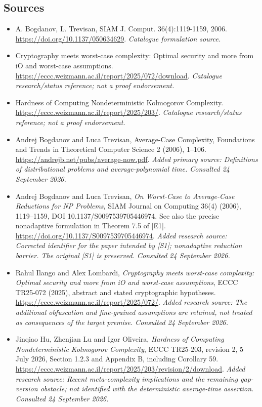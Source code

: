 \documentclass[11pt]{article}
\begin{document}
\subsection{Sources}
\begin{itemize}\raggedright
\item[\textnormal{[S1]}]\hypertarget{source:statement:1}{} A. Bogdanov, L. Trevisan, SIAM J. Comput. 36(4):1119-1159, 2006.
\url{https://doi.org/10.1137/050634629}.
{\small\textit{Catalogue formulation source.}}
\item[\textnormal{[S2]}]\hypertarget{source:statement:2}{} Cryptography meets worst-case complexity: Optimal security and more from iO and worst-case assumptions.
\url{https://eccc.weizmann.ac.il/report/2025/072/download}.
{\small\textit{Catalogue research/status reference; not a proof endorsement.}}
\item[\textnormal{[S3]}]\hypertarget{source:statement:3}{} Hardness of Computing Nondeterministic Kolmogorov Complexity.
\url{https://eccc.weizmann.ac.il/report/2025/203/}.
{\small\textit{Catalogue research/status reference; not a proof endorsement.}}
\item[\textnormal{[E1]}]\hypertarget{extra:statement:1}{} Andrej Bogdanov and Luca Trevisan, Average-Case Complexity, Foundations and Trends in Theoretical Computer Science 2 (2006), 1--106.
\url{https://andrejb.net/pubs/average-now.pdf}.
{\small\textit{Added primary source: Definitions of distributional problems and average-polynomial time. Consulted 24 September 2026.}}
\item[\textnormal{[E2]}]\hypertarget{extra:statement:2}{} Andrej Bogdanov and Luca Trevisan, \emph{On Worst-Case to Average-Case Reductions for NP Problems}, SIAM Journal on Computing 36(4) (2006), 1119--1159, DOI 10.1137/S0097539705446974. See also the precise nonadaptive formulation in Theorem 7.5 of [E1].
\url{https://doi.org/10.1137/S0097539705446974}.
{\small\textit{Added research source: Corrected identifier for the paper intended by [S1]; nonadaptive reduction barrier. The original [S1] is preserved. Consulted 24 September 2026.}}
\item[\textnormal{[E3]}]\hypertarget{extra:statement:3}{} Rahul Ilango and Alex Lombardi, \emph{Cryptography meets worst-case complexity: Optimal security and more from iO and worst-case assumptions}, ECCC TR25-072 (2025), abstract and stated cryptographic hypotheses.
\url{https://eccc.weizmann.ac.il/report/2025/072/}.
{\small\textit{Added research source: The additional obfuscation and fine-grained assumptions are retained, not treated as consequences of the target premise. Consulted 24 September 2026.}}
\item[\textnormal{[E4]}]\hypertarget{extra:statement:4}{} Jinqiao Hu, Zhenjian Lu and Igor Oliveira, \emph{Hardness of Computing Nondeterministic Kolmogorov Complexity}, ECCC TR25-203, revision 2, 5 July 2026, Section 1.2.3 and Appendix B, including Corollary 59.
\url{https://eccc.weizmann.ac.il/report/2025/203/revision/2/download}.
{\small\textit{Added research source: Recent meta-complexity implications and the remaining gap-version obstacle; not identified with the deterministic average-time assertion. Consulted 24 September 2026.}}
\end{itemize}
\end{document}
